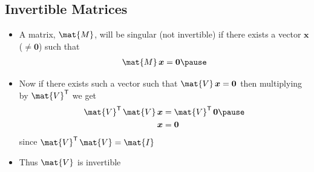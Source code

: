 \begin{slide}
\section[-2]{Invertible Matrices}

\begin{PauseHighLight}
  \begin{itemize}
  \item A matrix, $\mat{M}$, will be singular (not invertible) if there
    exists a vector $\bm{x}$ ($\neq\bm{0}$) such that
    \begin{align*}
      \mat{M}\,\bm{x} = \bm{0}\pause
    \end{align*}
  \item Now if there exists such a vector such that $\mat{V}\,\bm{x} =
    \bm{0}$ then multiplying by $\mat{V}^\tr$ we get
    \begin{align*}
      \mat{V}^\tr\, \mat{V}\, \bm{x} &= \mat{V}^\tr\, \bm{0} \pause \\
      \bm{x} &= \bm{0}
    \end{align*}
    since $\mat{V}^\tr\, \mat{V} = \mat{I}$\pauseb
  \item Thus $\mat{V}$ is invertible\pauseb
  \end{itemize}
\end{PauseHighLight}

\end{slide}




